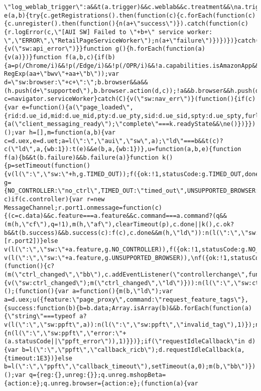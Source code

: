 \documentclass[
]{article}
\begin{document}
\begin{verbatim}
\"log_weblab_trigger\":a&&t(a.trigger)&&c.weblab&&c.treatment&&\na.trigger(c.weblab,c.treatment);break;default:n(\"sw:unsupported_message_command\",1)}}}function e(a,b){try{c.getRegistrations().then(function(c){c.forEach(function(c){c.unregister().then(function(){n(a+\"success\")}).catch(function(c){r.logError(c,\"[AUI SW] Failed to \"+b+\" service worker: \",\"ERROR\",\"RetailPageServiceWorker\");n(a+\"failure\")})})})}catch(Ba){v(\"sw:api_error\")}}function g(){h.forEach(function(a){v(a)})}function f(a,b,c){if(b){a=p(/Chrome/i)&&!p(/Edge/i)&&!p(/OPR/i)&&!a.capabilities.isAmazonApp&&\n!p(new RegExp(aa+\"bwv\"+aa+\"b\"));var d=\"sw:browser:\"+c+\":\";b.browser&&a&&(h.push(d+\"supported\"),b.browser.action(d,c));!a&&b.browser&&h.push(d+\"unsupported\")}}try{var c=navigator.serviceWorker}catch(C){v(\"sw:nav_err\")}(function(){if(c){var e=function(){a(\"page_loaded\",{rid:d.ue_id,mid:d.ue_mid,pty:d.ue_pty,sid:d.ue_sid,spty:d.ue_spty,furl:d.ue_furl})};y(c,\"message\",b);a(\"client_messaging_ready\");r.when(\"load\").execute(e);y(c,\"controllerchange\",function(){a(\"client_messaging_ready\");\"complete\"===k.readyState&&\ne()})}})();var h=[],m=function(a,b){var c=d.uex,e=d.uet;a=l(\":\",\"aui\",\"sw\",a);\"ld\"===b&&t(c)?c(\"ld\",a,{wb:1}):t(e)&&e(b,a,{wb:1})},u=function(a,b,e){function f(a){b&&t(b.failure)&&b.failure(a)}function k(){p=setTimeout(function(){v(l(\":\",\"sw:\"+h,g.TIMED_OUT));f({ok:!1,statusCode:g.TIMED_OUT,done:!1});m(h,\"ld\")},e||4E3)}var g={NO_CONTROLLER:\"no_ctrl\",TIMED_OUT:\"timed_out\",UNSUPPORTED_BROWSER:\"unsupported_browser\",UNEXPECTED_RESPONSE:\"unexpected_response\"},h=l(\":\",a.feature,a.command),p,q=!0;if(\"MessageChannel\"in\nd&&c&&\"controller\"in c)if(c.controller){var r=new MessageChannel;r.port1.onmessage=function(c){(c=c.data)&&c.feature===a.feature&&c.command===a.command?(q&&(m(h,\"cf\"),q=!1),m(h,\"af\"),clearTimeout(p),c.done||k(),c.ok?b&&t(b.success)&&b.success(c):f(c),c.done&&m(h,\"ld\")):n(l(\":\",\"sw:\"+h,g.UNEXPECTED_RESPONSE),1)};k();m(h,\"bb\");c.controller.postMessage(a,[r.port2])}else v(l(\":\",\"sw:\"+a.feature,g.NO_CONTROLLER)),f({ok:!1,statusCode:g.NO_CONTROLLER,done:!0});else v(l(\":\",\"sw:\"+a.feature,g.UNSUPPORTED_BROWSER)),\nf({ok:!1,statusCode:g.UNSUPPORTED_BROWSER,done:!0})};(function(){c?(m(\"ctrl_changed\",\"bb\"),c.addEventListener(\"controllerchange\",function(){v(\"sw:ctrl_changed\");m(\"ctrl_changed\",\"ld\")})):n(l(\":\",\"sw:ctrl_changed\",\"sw_unsupp\"),1)})();(function(){var a=function(){m(b,\"ld\");var a=d.uex;u({feature:\"page_proxy\",command:\"request_feature_tags\"},{success:function(b){b=b.data;Array.isArray(b)&&b.forEach(function(a){\"string\"===typeof a?v(l(\":\",\"sw:ppft\",a)):n(l(\":\",\"sw:ppft\",\"invalid_tag\"),1)});n(l(\":\",\"sw:ppft\",\n\"success\"),1);x&&x.isl&&t(a)&&a(\"at\")},failure:function(a){n(l(\":\",\"sw:ppft\",\"error:\"+(a.statusCode||\"ppft_error\")),1)}})};if(\"requestIdleCallback\"in d){var b=l(\":\",\"ppft\",\"callback_ricb\");d.requestIdleCallback(a,{timeout:1E3})}else b=l(\":\",\"ppft\",\"callback_timeout\"),setTimeout(a,0);m(b,\"bb\")})();var q={reg:{},unreg:{}};q.unreg.mshopBeta={action:e};q.unreg.browser={action:e};(function(a){var 
\end{verbatim}
\end{document}

